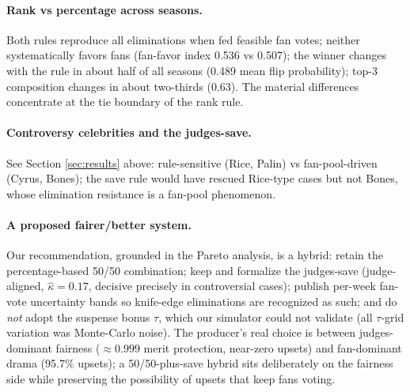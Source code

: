 \documentclass[11pt]{article}
\begin{document}
\paragraph{Rank vs percentage across seasons.} Both rules reproduce all eliminations
when fed feasible fan votes; neither systematically favors fans (fan-favor index
0.536 vs 0.507); the winner changes with the rule in about half of all seasons
(0.489 mean flip probability); top-3 composition changes in about two-thirds (0.63).
The material differences concentrate at the tie boundary of the rank rule.

\paragraph{Controversy celebrities and the judges-save.} See Section
\ref{sec:results} above: rule-sensitive (Rice, Palin) vs fan-pool-driven (Cyrus,
Bones); the save rule would have rescued Rice-type cases but not Bones, whose
elimination resistance is a fan-pool phenomenon.

\paragraph{A proposed fairer/better system.} Our recommendation, grounded in the Pareto
analysis, is a hybrid: retain the percentage-based 50/50 combination; keep and
formalize the judges-save (judge-aligned, $\hat\kappa = 0.17$, decisive precisely in
controversial cases); publish per-week fan-vote uncertainty bands so knife-edge
eliminations are recognized as such; and do \emph{not} adopt the suspense bonus
$\tau$, which our simulator could not validate (all $\tau$-grid variation was
Monte-Carlo noise). The producer's real choice is between judges-dominant fairness
($\approx 0.999$ merit protection, near-zero upsets) and fan-dominant drama
(95.7\% upsets); a 50/50-plus-save hybrid sits deliberately on the fairness side while
preserving the possibility of upsets that keep fans voting.
\end{document}
